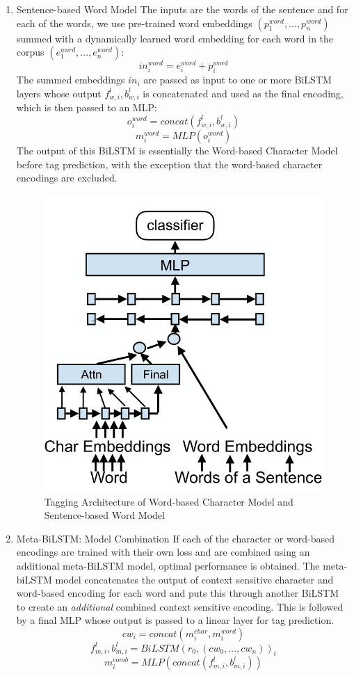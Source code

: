 \documentclass[11pt]{article}
\begin{document}
\begin{enumerate}
\item Sentence-based Word Model
\label{sec:org6d063a4}
The inputs are the words of the sentence and for each of the words, we use pre-trained word embeddings \((p_{1}^{word},...,p_{n}^{word})\) summed with a dynamically learned word embedding for each word in the corpus \((e_{1}^{word},...,e_{n}^{word})\):
\[
in_{i}^{word} = e_{i}^{word}+p_{i}^{word}
\]
The summed embeddings \(in_{i}\) are passed as input to one or more BiLSTM layers whose output \(f_{w,i}^{l}, b_{w,i}^{l}\) is concatenated and used as the final encoding, which is then passed to an MLP:
\[
o_{i}^{word} = concat(f_{w,i}^{l}, b_{w,i}^{l})
\]
\[
m_{i}^{word} = MLP(o_{i}^{word})
\]
The output of this BiLSTM is essentially the Word-based Character Model before tag prediction, with the exception that the word-based character encodings are excluded.

\begin{figure}[htbp]
\centering
\includegraphics[width=.9\linewidth]{assets/nnfl2a.png}
\caption{Tagging Architecture of Word-based Character Model and Sentence-based Word Model}
\end{figure}

\item Meta-BiLSTM: Model Combination
\label{sec:orgabde472}
If each of the character or word-based encodings are trained with their own loss and are combined using an additional meta-BiLSTM model, optimal performance is obtained. The meta-biLSTM model concatenates the output of context sensitive character and word-based encoding for each word and puts this through another BiLSTM to create an \emph{additional} combined context sensitive encoding. This is followed by a final MLP whose output is passed to a linear layer for tag prediction.
\[
cw_{i} = concat(m_{i}^{char}, m_{i}^{word})
\]
\[
f_{m,i}^{l}, b_{m,i}^{l} = BiLSTM(r_{0},(cw_{0},...,cw_{n}))_{i}
\]
\[
m_{i}^{comb} = MLP(concat(f_{m,i}^{l}, b_{m,i}^{l}))
\]


\end{enumerate}
\end{document}
